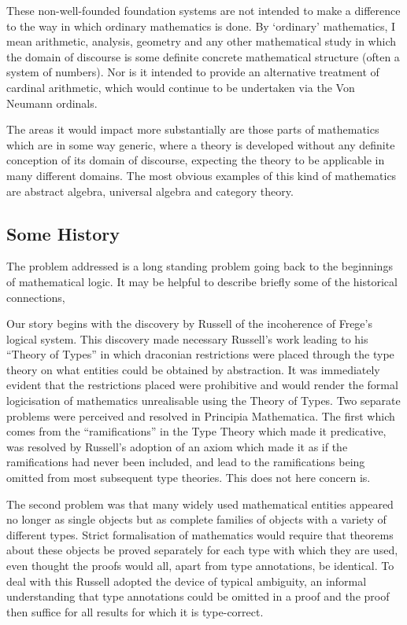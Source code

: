 \documentclass[11pt,a4paper]{article}
\begin{document}
These non-well-founded foundation systems are not intended to make a difference to the way in which ordinary mathematics is done.
By `ordinary' mathematics, I mean arithmetic, analysis, geometry and any other mathematical study in which the domain of discourse is some definite concrete mathematical structure (often a system of numbers).
Nor is it intended to provide an alternative treatment of cardinal arithmetic, which would continue to be undertaken via the Von Neumann ordinals.

The areas it would impact more substantially are those parts of mathematics which are in some way generic, where a theory is developed without any definite conception of its domain of discourse, expecting the theory to be applicable in many different domains.
The most obvious examples of this kind of mathematics are abstract algebra, universal algebra and category theory.

\subsection{Some History}

The problem addressed is a long standing problem going back to the beginnings of mathematical logic.
It may be helpful to describe briefly some of the historical connections,

Our story begins with the discovery by Russell of the incoherence of Frege's logical system.
This discovery made necessary Russell's work leading to his ``Theory of Types'' in which draconian restrictions were placed through the type theory on what entities could be obtained by abstraction.
It was immediately evident that the restrictions placed were prohibitive and would render the formal logicisation of mathematics unrealisable using the Theory of Types.
Two separate problems were perceived and resolved in Principia Mathematica.
The first which comes from the ``ramifications'' in the Type Theory which made it predicative, was resolved by Russell's adoption of an axiom which made it as if the ramifications had never been included, and lead to the ramifications being omitted from most subsequent type theories.
This does not here concern is.

The second problem was that many widely used mathematical entities appeared no longer as single objects but as complete families of objects with a variety of different types.
Strict formalisation of mathematics would require that theorems about these objects be proved separately for each type with which they are used, even thought the proofs would all, apart from type annotations, be identical.
To deal with this Russell adopted the device of typical ambiguity, an informal understanding that type annotations could be omitted in a proof and the proof then suffice for all results for which it is type-correct.
\end{document}
